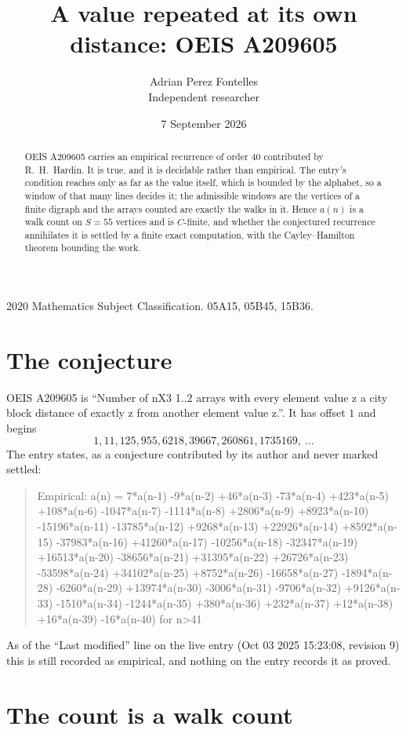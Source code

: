 \documentclass[11pt,a4paper]{article}
\title{A value repeated at its own distance: OEIS A209605}
\author{Adrian Perez Fontelles\\ \small Independent researcher}
\date{7 September 2026}
\theoremstyle{plain}
\theoremstyle{definition}
\begin{document}
\maketitle

\begin{abstract}
OEIS A209605 carries an empirical recurrence of order $40$ contributed by R.~H.~Hardin. It is
true, and it is decidable rather than empirical. The entry's condition reaches only as far as the value itself, which is bounded by the
alphabet, so a window of that many lines decides it; the
admissible windows are the vertices of a finite digraph and the arrays counted are exactly the
walks in it. Hence $a(n)$ is a walk count on $S=55$ vertices and is $C$-finite, and whether the
conjectured recurrence annihilates it is settled by a finite exact computation, with the
Cayley--Hamilton theorem bounding the work.
\end{abstract}

\noindent\small 2020 Mathematics Subject Classification. 05A15, 05B45, 15B36.\normalsize

\section{The conjecture}

OEIS A209605 is ``Number of nX3 1..2 arrays with every element value z a city block distance of exactly z from another element value z.''. It has offset $1$ and begins
\[
1, 11, 125, 955, 6218, 39667, 260861, 1735169,\ \dots
\]
The entry states, as a conjecture contributed by its author and never marked settled:
\begin{quote}
Empirical: a(n) = 7*a(n-1) -9*a(n-2) +46*a(n-3) -73*a(n-4) +423*a(n-5) +108*a(n-6) -1047*a(n-7) -1114*a(n-8) +2806*a(n-9) +8923*a(n-10) -15196*a(n-11) -13785*a(n-12) +9268*a(n-13) +22926*a(n-14) +8592*a(n-15) -37983*a(n-16) +41260*a(n-17) -10256*a(n-18) -32347*a(n-19) +16513*a(n-20) -38656*a(n-21) +31395*a(n-22) +26726*a(n-23) -53598*a(n-24) +34102*a(n-25) +8752*a(n-26) -16658*a(n-27) -1894*a(n-28) -6260*a(n-29) +13974*a(n-30) -3006*a(n-31) -9706*a(n-32) +9126*a(n-33) -1510*a(n-34) -1244*a(n-35) +380*a(n-36) +232*a(n-37) +12*a(n-38) +16*a(n-39) -16*a(n-40) for n>41
\end{quote}
As of the ``Last modified'' line on the live entry (Oct 03 2025 15:23:08, revision 9) this is still
recorded as empirical, and nothing on the entry records it as proved.

\section{The count is a walk count}
\end{document}
